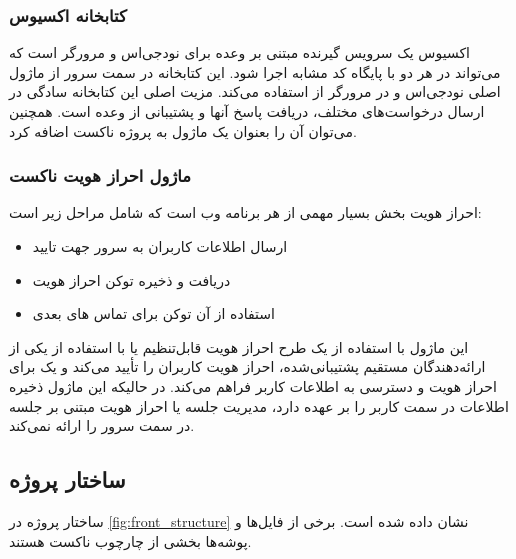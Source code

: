 \subsubsection{کتابخانه اکسیوس}

اکسیوس یک سرویس گیرنده  مبتنی بر وعده برای نودجی‌اس و مرورگر است که می‌تواند در هر دو با پایگاه کد مشابه اجرا شود. این کتابخانه در سمت سرور از ماژول اصلی  نودجی‌اس و در مرورگر از  استفاده می‌کند. مزیت اصلی این کتابخانه سادگی در ارسال درخواست‌های مختلف، دریافت پاسخ آنها و پشتیبانی از  وعده است\cite{axios}. همچنین می‌توان آن را بعنوان یک ماژول به پروژه ناکست اضافه کرد.

\subsubsection{ماژول احراز هویت ناکست}

احراز هویت بخش بسیار مهمی از هر برنامه وب است که شامل مراحل زیر است:

\begin{itemize}
\item ارسال اطلاعات کاربران به سرور جهت تایید
\item دریافت و ذخیره توکن احراز هویت
\item استفاده از آن توکن برای تماس های بعدی 
\end{itemize}

این ماژول با استفاده از یک طرح احراز هویت قابل‌تنظیم یا با استفاده از یکی از ارائه‌دهندگان مستقیم پشتیبانی‌شده، احراز هویت کاربران را تأیید می‌کند و یک  برای احراز هویت و دسترسی به اطلاعات کاربر فراهم می‌کند. در حالیکه این ماژول ذخیره اطلاعات در سمت کاربر را بر عهده دارد، مدیریت جلسه یا احراز هویت مبتنی بر جلسه در سمت سرور را ارائه نمی‌کند\cite{nuxt_auth}.

\subsection{ساختار پروژه}

ساختار پروژه در \cref{fig:front_structure} نشان داده شده است. برخی از فایل‌ها و پوشه‌ها بخشی از چارچوب ناکست هستند.

